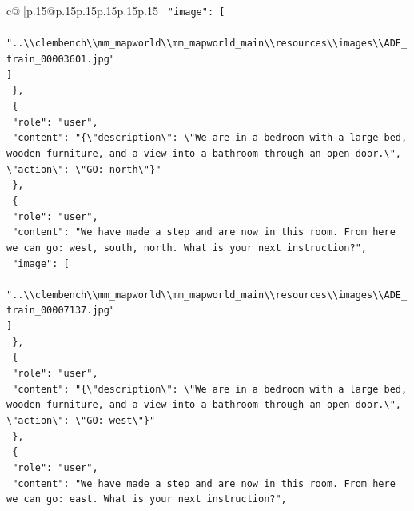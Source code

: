 \documentclass{article}
\begin{document}
{\begin{supertabular}{c@{$\;$}|p{.15\linewidth}@{}p{.15\linewidth}p{.15\linewidth}p{.15\linewidth}p{.15\linewidth}p{.15\linewidth}}
{{{\texttt{    "image": {[}} \\
\texttt{      "..\textbackslash{}\textbackslash{}clembench\textbackslash{}\textbackslash{}mm\_mapworld\textbackslash{}\textbackslash{}mm\_mapworld\_main\textbackslash{}\textbackslash{}resources\textbackslash{}\textbackslash{}images\textbackslash{}\textbackslash{}ADE\_train\_00003601.jpg"} \\
\texttt{    {]}} \\
\texttt{  \},} \\
\texttt{  \{} \\
\texttt{    "role": "user",} \\
\texttt{    "content": "\{\textbackslash{}"description\textbackslash{}": \textbackslash{}"We are in a bedroom with a large bed, wooden furniture, and a view into a bathroom through an open door.\textbackslash{}", \textbackslash{}"action\textbackslash{}": \textbackslash{}"GO: north\textbackslash{}"\}"} \\
\texttt{  \},} \\
\texttt{  \{} \\
\texttt{    "role": "user",} \\
\texttt{    "content": "We have made a step and are now in this room. From here we can go: west, south, north. What is your next instruction?",} \\
\texttt{    "image": {[}} \\
\texttt{      "..\textbackslash{}\textbackslash{}clembench\textbackslash{}\textbackslash{}mm\_mapworld\textbackslash{}\textbackslash{}mm\_mapworld\_main\textbackslash{}\textbackslash{}resources\textbackslash{}\textbackslash{}images\textbackslash{}\textbackslash{}ADE\_train\_00007137.jpg"} \\
\texttt{    {]}} \\
\texttt{  \},} \\
\texttt{  \{} \\
\texttt{    "role": "user",} \\
\texttt{    "content": "\{\textbackslash{}"description\textbackslash{}": \textbackslash{}"We are in a bedroom with a large bed, wooden furniture, and a view into a bathroom through an open door.\textbackslash{}", \textbackslash{}"action\textbackslash{}": \textbackslash{}"GO: west\textbackslash{}"\}"} \\
\texttt{  \},} \\
\texttt{  \{} \\
\texttt{    "role": "user",} \\
\texttt{    "content": "We have made a step and are now in this room. From here we can go: east. What is your next instruction?",} \\
}}}
\end{supertabular}}
\end{document}

